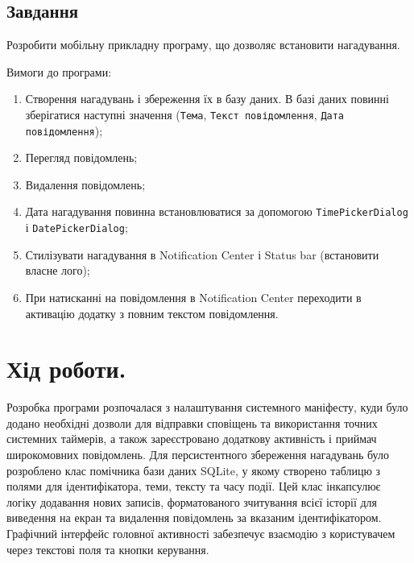 \documentclass[14pt, a4paper]{extreport}
\begin{document}
	\subsection*{Завдання}
	
	Розробити мобільну прикладну програму, що дозволяє встановити нагадування.
	
	Вимоги до програми:
	
	\begin{enumerate}
		\item Створення нагадувань і збереження їх в базу даних. В базі даних повинні зберігатися наступні значення (\texttt{Тема}, \texttt{Текст повідомлення}, \texttt{Дата повідомлення});
		
		\item Перегляд повідомлень;
		
		\item Видалення повідомлень;
		
		\item Дата нагадування повинна встановлюватися за допомогою \texttt{TimePickerDialog} і \texttt{DatePickerDialog};
		
		\item Стилізувати нагадування в Notification Center і Status bar (встановити власне лого);
		
		\item При натисканні на повідомлення в Notification Center переходити в активацію додатку з повним текстом повідомлення.
	\end{enumerate}
	
	\section*{Хід роботи.}
	
	Розробка програми розпочалася з налаштування системного маніфесту, куди було додано необхідні дозволи для відправки сповіщень та використання точних системних таймерів, а також зареєстровано додаткову активність і приймач широкомовних повідомлень. Для персистентного збереження нагадувань було розроблено клас помічника бази даних SQLite, у якому створено таблицю з полями для ідентифікатора, теми, тексту та часу події. Цей клас інкапсулює логіку додавання нових записів, форматованого зчитування всієї історії для виведення на екран та видалення повідомлень за вказаним ідентифікатором. Графічний інтерфейс головної активності забезпечує взаємодію з користувачем через текстові поля та кнопки керування. 
	
	
\end{document}
